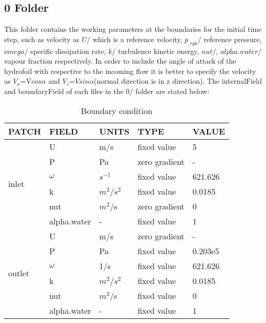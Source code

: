 \subsection{0 Folder}This folder contains the working parameters  at the boundaries for the initial time step, such 
as velocity as ${\textit {U}}/$ which is a reference velocity, ${\textit{p}}_{{\textit {\_rgh}}}/$  
reference pressure, ${\textit {omega}}/$ specific dissipation rate, ${\textit {k}}/$ 
turbulence kinetic energy, ${\textit {nut}}/$, ${\textit {alpha.water}}/$ vapour fraction 
respectively. In order to include the angle of attack of the hydrofoil with respective to the incoming flow it is better to specify the velocity as 
$V_x$=V$cos \alpha$ and $V_z$=$V sin \alpha$(normal direction is in z direction). The internalField and 
boundaryField of each files in the $0/$ folder are stated below:\\ 
\begin{table}[h]
\centering
\begin{tabular}{|l|l|l|l|l|}
\hline
 \rowcolor{gray!20}      PATCH           &FIELD  & UNITS & TYPE &VALUE \\ \hline
\multirow{6}{*}{inlet} & U & m/s & fixed value  & 5  \\ \cline{2-5} 
                  &P  & Pa & zero gradient &- \\ \cline{2-5} 
                  &$\omega$  & $s^{-1}$ &fixed value  & 621.626 \\ \cline{2-5} 
                  & k & $m^2$/$s^2$ & fixed value & 0.0185 \\ \cline{2-5} 
                  & nut & $m^2$/s & zero gradient & 0 \\ \cline{2-5} 
                  &alpha.water  & - &fixed value  & 1 \\ \hline
\multirow{6}{*}{outlet} & U & m/s & zero gradient &-  \\ \cline{2-5} 
                  & P & Pa & fixed value  & 0.203e5 \\ \cline{2-5} 
                  & $\omega$ & 1/s & fixed value & 621.626 \\ \cline{2-5} 
                  &  k& $m^2$/$s^2$ & fixed value & 0.0185 \\ \cline{2-5} 
                  & nut & $m^2$/s & fixed value & 0 \\ \cline{2-5} 
                  & alpha.water & - &fixed value & 1 \\ \hline
\end{tabular}
\caption{Boundary condition}
\end{table}





